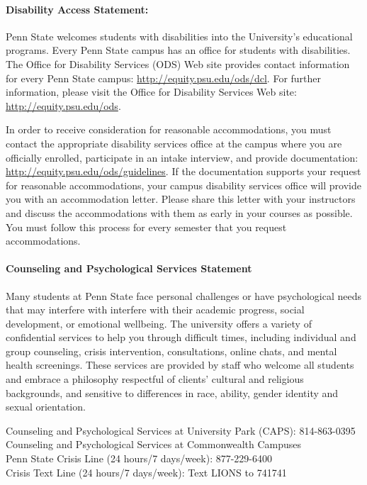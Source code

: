 \documentclass[11pt]{article}
\begin{document}
\paragraph{Disability Access Statement:} Penn State welcomes students with disabilities into the University's educational programs. Every Penn State campus has an office for students with disabilities. The Office for Disability Services (ODS) Web site provides contact information for every Penn State campus: \url{http://equity.psu.edu/ods/dcl}. For further information, please visit the Office for Disability Services Web site: \url{http://equity.psu.edu/ods}. 

In order to receive consideration for reasonable accommodations, you must contact the appropriate disability services office at the campus where you are officially enrolled, participate in an intake interview, and provide documentation: \url{http://equity.psu.edu/ods/guidelines}. If the documentation supports your request for reasonable accommodations, your campus disability services office will provide you with an accommodation letter. Please share this letter with your instructors and discuss the accommodations with them as early in your courses as possible. You must follow this process for every semester that you request accommodations.

\paragraph{Counseling and Psychological Services Statement}
Many students at Penn State face personal challenges or have psychological needs that may interfere with interfere with their academic progress, social development, or emotional wellbeing. The university offers a variety of confidential services to help you through difficult times, including individual and group counseling, crisis intervention, consultations, online chats, and mental health screenings. These services are provided by staff who welcome all students and embrace a philosophy respectful of clients' cultural and religious backgrounds, and sensitive to differences in race, ability, gender identity and sexual orientation.

Counseling and Psychological Services at University Park  (CAPS): 814-863-0395\\
Counseling and Psychological Services at Commonwealth Campuses\\
Penn State Crisis Line (24 hours/7 days/week): 877-229-6400\\
Crisis Text Line (24 hours/7 days/week): Text LIONS to 741741
\end{document}
